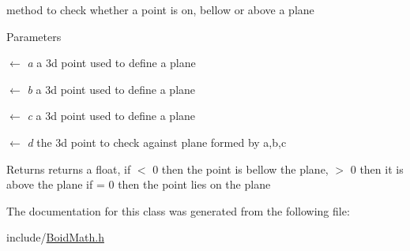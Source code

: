 method to check whether a point is on, bellow or above a plane 
\begin{DoxyParams}{Parameters}
\item[\mbox{$\leftarrow$} {\em a}]a 3d point used to define a plane \item[\mbox{$\leftarrow$} {\em b}]a 3d point used to define a plane \item[\mbox{$\leftarrow$} {\em c}]a 3d point used to define a plane \item[\mbox{$\leftarrow$} {\em d}]the 3d point to check against plane formed by a,b,c \end{DoxyParams}
\begin{DoxyReturn}{Returns}
returns a float, if $<$ 0 then the point is bellow the plane, $>$ 0 then it is above the plane if = 0 then the point lies on the plane 
\end{DoxyReturn}


The documentation for this class was generated from the following file:\begin{DoxyCompactItemize}
\item 
include/\hyperlink{BoidMath_8h}{BoidMath.h}\end{DoxyCompactItemize}
